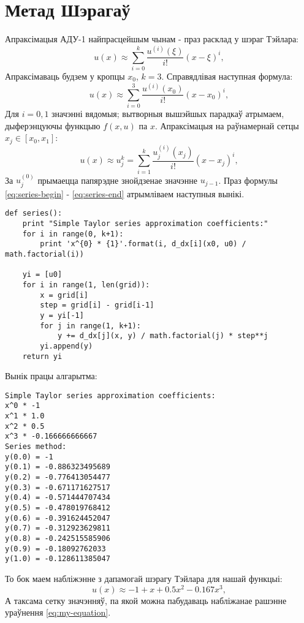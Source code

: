 \section{Метад Шэрагаў}

Апраксімацыя АДУ-1 найпрасцейшым чынам - праз расклад у шэраг Тэйлара:\\
\begin{equation} \label{eq:series-begin}
    u(x) \approx \sum_{i=0}^{k} \frac{u^{(i)}(\xi)}{i!}(x-\xi)^{i},
\end{equation}
Апраксімаваць будзем у кропцы $x_0$, $k = 3$. Справядлівая наступная формула:
\begin{equation}
    u(x) \approx \sum_{i=0}^{3} \frac{u^{(i)}(x_0)}{i!}(x-x_0)^{i},
\end{equation}
Для $i = 0, 1$ значэнні вядомыя; вытворныя вышэйшых парадкаў атрымаем, дыферэнцуючы функцыю $f(x, u)$ па $x$.
Апраксімацыя на раўнамернай сетцы $x_j \in [x_0, x_1]$:
\begin{equation} \label{eq:series-end}
    u(x) \approx u_j^k = \sum_{i=1}^{k} \frac{u_j^{(i)}(x_j)}{i!}(x-x_j)^{i},
\end{equation}
За $u_j^{(0)}$ прымаецца папярэдне знойдзенае значэнне $u_{j-1}$.
Праз формулы \eqref{eq:series-begin} - \eqref{eq:series-end} атрымліваем наступныя вынікі.

{\small
\begin{verbatim}
def series():
    print "Simple Taylor series approximation coefficients:"
    for i in range(0, k+1):
        print 'x^{0} * {1}'.format(i, d_dx[i](x0, u0) / math.factorial(i))

    yi = [u0]
    for i in range(1, len(grid)):
        x = grid[i]
        step = grid[i] - grid[i-1]
        y = yi[-1]
        for j in range(1, k+1):
            y += d_dx[j](x, y) / math.factorial(j) * step**j
        yi.append(y)
    return yi
\end{verbatim}
}

Вынік працы алгарытма:

{\small
\begin{verbatim}
Simple Taylor series approximation coefficients:
x^0 * -1
x^1 * 1.0
x^2 * 0.5
x^3 * -0.166666666667
Series method:
y(0.0) = -1
y(0.1) = -0.886323495689
y(0.2) = -0.776413054477
y(0.3) = -0.671171627517
y(0.4) = -0.571444707434
y(0.5) = -0.478019768412
y(0.6) = -0.391624452047
y(0.7) = -0.312923629811
y(0.8) = -0.242515585906
y(0.9) = -0.18092762033
y(1.0) = -0.128611385047
\end{verbatim}
}

То бок маем набліжэнне з дапамогай шэрагу Тэйлара для нашай функцыі:
$$ u(x) \approx -1 + x + 0.5x^2 - 0.167x^3,$$
А таксама сетку значэнняў, па якой можна пабудаваць набліжанае рашэнне ураўнення \eqref{eq:my-equation}.
